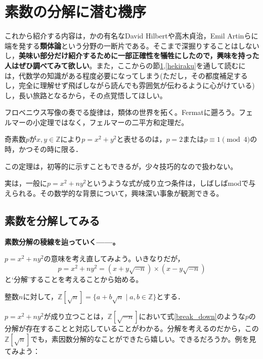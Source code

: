 \section{素数の分解に潜む機序}\label{ruitai_game}
これから紹介する内容は，かの有名なDavid Hilbertや高木貞治，Emil Artinらに端を発する\textbf{類体論}という分野の一断片である。そこまで深掘りすることはしないし，\textbf{美味い部分だけ紹介するために一部正確性を犠牲にしたので，興味を持った人はぜひ調べてみて欲しい}。また，ここからの節\ref{ruitai_game},\ref{hekiraku}を通して読むには，代数学の知識がある程度必要になってしまう(ただし，その都度補足するし，完全に理解せず飛ばしながら読んでも雰囲気が伝わるように心がけている)し，長い旅路となるから，その点覚悟してほしい。

フロベニウス写像の奏でる旋律は，類体の世界を拓く。Fermatに遡ろう。フェルマーの小定理ではなく，フェルマーの二平方和定理だ。

\begin{thm}
    奇素数$p$が$x,y\in \mathds{Z}$により$p=x^2+y^2$と表せるのは，$p=2$または$p\equiv 1 \pmod{4}$の時，かつその時に限る．
\end{thm}

この定理は，初等的に示すこともできるが，少々技巧的なので扱わない。

実は，一般に$p=x^2+ny^2$というような式が成り立つ条件は，しばしばmodで与えられる。その数学的な背景について，興味深い事象が観測できる。

\subsection{素数を分解してみる}
\textbf{素数分解の稜線を辿っていく------。}

\vspace{10pt}

$p=x^2+ny^2$の意味を考え直してみよう。いきなりだが，
\begin{equation}\label{break_down}
    p=x^2+ny^2=(x+y\sqrt{-n})\times (x-y\sqrt{-n})
\end{equation}
と`分解'することを考えることから始める。

\vspace{10pt}

\begin{dfn}
    整数$n$に対して，$\mathds{Z}[\sqrt{n}]=\{a+b\sqrt{n} \mid a,b \in \mathds{Z}\}$とする．
\end{dfn}

$p=x^2+ny^2$が成り立つことは，$\mathds{Z}[\sqrt{-n}]$において式\eqref{break_down}のような$p$の分解が存在することと対応していることがわかる。分解を考えるのだから，この$\mathds{Z}[\sqrt{n}]$でも，素因数分解的なことができたら嬉しい。できるだろうか。例を見てみよう：

